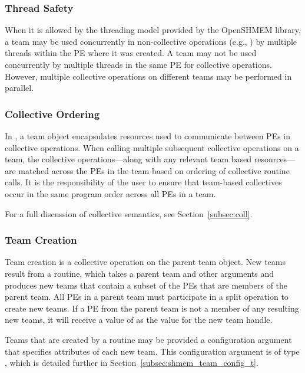 \subsubsection*{Thread Safety}

When it is allowed by the threading model provided by the OpenSHMEM
library, a team may be used concurrently in non-collective operations
(e.g., ) by multiple threads within the
\ac{PE} where it was created.
A team may not be used concurrently by multiple threads in the same \ac{PE} for
collective operations. However, multiple collective operations on different
teams may be performed in parallel.

\subsubsection*{Collective Ordering}

In \openshmem, a team object encapsulates resources used to communicate
between \acp{PE} in collective operations. When calling multiple subsequent
collective operations on a team, the collective operations---along with any
relevant team based resources---are matched across the \acp{PE} in the team
based on ordering of collective routine calls. It is the responsibility
of the user to ensure that team-based collectives occur in the same program order
across all \acp{PE} in a team.

For a full discussion of collective semantics, see Section~\ref{subsec:coll}.

\subsubsection*{Team Creation}

Team creation is a collective operation on the parent team object. New teams
result from a  routine, which takes a parent team
and other arguments and produces new teams that contain a subset of the \acp{PE}
that are members of the parent
team. All \acp{PE} in a parent team must participate in a split operation
to create new teams. If a \ac{PE} from the parent team is not a member of any
resulting new teams, it will receive a value of 
as the value for the new team handle.

Teams that are created by a  routine may be
provided a configuration argument that specifies attributes of each new team.
This configuration argument is of type , which
is detailed further in Section~\ref{subsec:shmem_team_config_t}.

